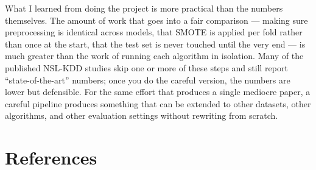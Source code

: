 \documentclass[11pt, a4paper]{article}
\begin{document}
What I learned from doing the project is more practical than the numbers themselves. The amount of work that goes into a fair comparison --- making sure preprocessing is identical across models, that SMOTE is applied per fold rather than once at the start, that the test set is never touched until the very end --- is much greater than the work of running each algorithm in isolation. Many of the published NSL-KDD studies skip one or more of these steps and still report ``state-of-the-art'' numbers; once you do the careful version, the numbers are lower but defensible. For the same effort that produces a single mediocre paper, a careful pipeline produces something that can be extended to other datasets, other algorithms, and other evaluation settings without rewriting from scratch.

\section*{References}
\end{document}
